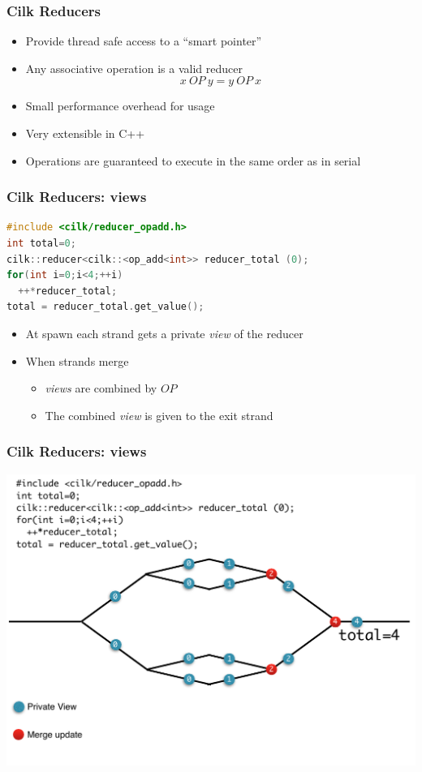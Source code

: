 \documentclass[fleqn,xcolor=table,10pt,final]{beamer}
\begin{document}
\begin{frame}
  \frametitle{Cilk Reducers}
  \begin{itemize}
    \item Provide thread safe access to a ``smart pointer''
    \item Any associative operation is a valid reducer
      \begin{equation*}
        x\ OP\ y = y\ OP\ x
      \end{equation*}
    \item Small performance overhead for usage
    \item Very extensible in C++
    \item Operations are guaranteed to execute in the same order as in serial
  \end{itemize}
\end{frame}

\begin{frame}[fragile]
  \frametitle{Cilk Reducers: views}
  \begin{lstlisting}[language=C++,basicstyle=\scriptsize]
#include <cilk/reducer_opadd.h>
int total=0;
cilk::reducer<cilk::<op_add<int>> reducer_total (0);
for(int i=0;i<4;++i)
  ++*reducer_total;
total = reducer_total.get_value();
  \end{lstlisting}
  \begin{itemize}
    \item At spawn each strand gets a private \emph{view} of the reducer
    \item When strands merge
      \begin{itemize}
        \item \emph{views} are combined by $OP$
        \item The combined \emph{view} is given to the exit strand
      \end{itemize}
  \end{itemize}
\end{frame}

\begin{frame}
  \frametitle{Cilk Reducers: views}
  \includegraphics[width=\textwidth]{figures/reduce}
\end{frame}
\end{document}
